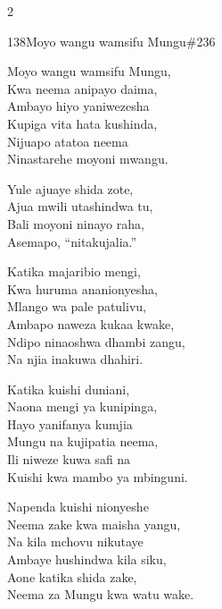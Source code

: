 \begin{multicols}{2}
\begin{hymn}{138}{Moyo wangu wamsifu Mungu}{\#236}
\begin{stanza}
Moyo wangu wamsifu Mungu,\\
Kwa neema anipayo daima,\\
Ambayo hiyo yaniwezesha\\
Kupiga vita hata kushinda,\\
Nijuapo atatoa neema\\
Ninastarehe moyoni mwangu.
\end{stanza}
\begin{chorus}
Yule ajuaye shida zote,\\
Ajua mwili utashindwa tu,\\
Bali moyoni ninayo raha,\\
Asemapo, ``nitakujalia.''
\end{chorus}
\begin{stanza}
Katika majaribio mengi,\\
Kwa huruma ananionyesha,\\
Mlango wa pale patulivu,\\
Ambapo naweza kukaa kwake,\\
Ndipo ninaoshwa dhambi zangu,\\
Na njia inakuwa dhahiri.
\end{stanza}
\begin{stanza}
Katika kuishi duniani,\\
Naona mengi ya kunipinga,\\
Hayo yanifanya kumjia\\
Mungu na kujipatia neema,\\
Ili niweze kuwa safi na\\
Kuishi kwa mambo ya mbinguni.
\end{stanza}
\begin{stanza}
Napenda kuishi nionyeshe\\
Neema zake kwa maisha yangu,\\
Na kila mchovu nikutaye\\
Ambaye hushindwa kila siku,\\
Aone katika shida zake,\\
Neema za Mungu kwa watu wake.
\end{stanza}
\end{hymn}


\end{multicols}
